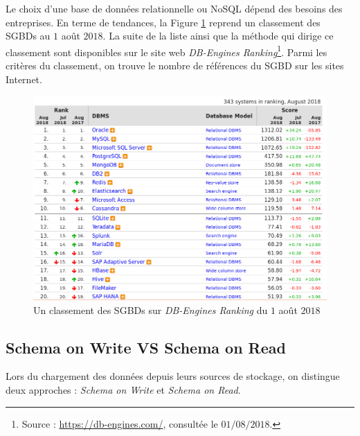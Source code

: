 		
		
		Le choix d'une base de données relationnelle ou NoSQL dépend des besoins des entreprises. En terme de tendances, la Figure \ref{fig:ranking-db} reprend un classement des SGBDs au $1$ août $ 2018 $. La suite de la liste ainsi que  la méthode qui dirige ce classement sont    disponibles sur le site  web \textit{DB-Engines Ranking}\footnote{Source : \url{https://db-engines.com/},  consultée le $01/08/2018$.}. Parmi les critères du classement, on trouve le nombre de références du SGBD sur les sites Internet. 
		
		
		\begin{figure}[H]
			\centering
			\captionsetup{justification=centering}
			\includegraphics[width=1\linewidth]{illustrations/ranking-db}
			\caption{Un classement des SGBDs sur \textit{DB-Engines Ranking} du $1$ août $2018$ }
			\label{fig:ranking-db}
		\end{figure}
		
		
		
		\subsection{Schema on Write VS Schema on Read} \label{sec:schema-read-write}
		
		Lors du chargement des données depuis leurs sources de stockage, on distingue deux approches : \textit{ Schema on Write} et \textit{Schema on Read}.
		

